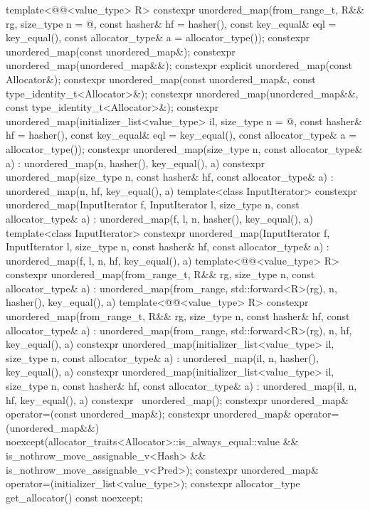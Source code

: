 \begin{codeblock}
{{    template<@@<value_type> R>
      constexpr unordered_map(from_range_t, R&& rg, size_type n = @\seebelow@,
        const hasher& hf = hasher(), const key_equal& eql = key_equal(),
        const allocator_type& a = allocator_type());
    constexpr unordered_map(const unordered_map&);
    constexpr unordered_map(unordered_map&&);
    constexpr explicit unordered_map(const Allocator&);
    constexpr unordered_map(const unordered_map&, const type_identity_t<Allocator>&);
    constexpr unordered_map(unordered_map&&, const type_identity_t<Allocator>&);
    constexpr unordered_map(initializer_list<value_type> il, size_type n = @\seebelow@,
                            const hasher& hf = hasher(),
                            const key_equal& eql = key_equal(),
                            const allocator_type& a = allocator_type());
    constexpr unordered_map(size_type n, const allocator_type& a)
      : unordered_map(n, hasher(), key_equal(), a) { }
    constexpr unordered_map(size_type n, const hasher& hf, const allocator_type& a)
      : unordered_map(n, hf, key_equal(), a) { }
    template<class InputIterator>
      constexpr unordered_map(InputIterator f, InputIterator l, size_type n,
                              const allocator_type& a)
        : unordered_map(f, l, n, hasher(), key_equal(), a) { }
    template<class InputIterator>
      constexpr unordered_map(InputIterator f, InputIterator l, size_type n, const hasher& hf,
                    const allocator_type& a)
        : unordered_map(f, l, n, hf, key_equal(), a) { }
    template<@@<value_type> R>
      constexpr unordered_map(from_range_t, R&& rg, size_type n, const allocator_type& a)
        : unordered_map(from_range, std::forward<R>(rg), n, hasher(), key_equal(), a) { }
    template<@@<value_type> R>
      constexpr unordered_map(from_range_t, R&& rg, size_type n, const hasher& hf,
                              const allocator_type& a)
        : unordered_map(from_range, std::forward<R>(rg), n, hf, key_equal(), a) { }
    constexpr unordered_map(initializer_list<value_type> il, size_type n,
                            const allocator_type& a)
      : unordered_map(il, n, hasher(), key_equal(), a) { }
    constexpr unordered_map(initializer_list<value_type> il, size_type n, const hasher& hf,
                  const allocator_type& a)
      : unordered_map(il, n, hf, key_equal(), a) { }
    constexpr ~unordered_map();
    constexpr unordered_map& operator=(const unordered_map&);
    constexpr unordered_map& operator=(unordered_map&&)
      noexcept(allocator_traits<Allocator>::is_always_equal::value &&
               is_nothrow_move_assignable_v<Hash> &&
               is_nothrow_move_assignable_v<Pred>);
    constexpr unordered_map& operator=(initializer_list<value_type>);
    constexpr allocator_type get_allocator() const noexcept;

}}
\end{codeblock}
